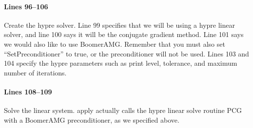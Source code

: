 \paragraph{Lines 96--106}
Create the hypre solver.  Line 99 specifies that we will be using a hypre linear
solver, and line 100 says it will be the conjugate gradient method.  Line 101
says we would also like to use BoomerAMG.  Remember that you must also set
``SetPreconditioner'' to true, or the preconditioner will not be used.  Lines
103 and 104 specify the hypre parameters such as print level, tolerance, and
maximum number of iterations.

\paragraph{Lines 108--109}
Solve the linear system.  apply actually calls the hypre linear solve routine
PCG with a BoomerAMG preconditioner, as we specified above.
